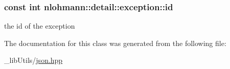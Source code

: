 \subsubsection[{\texorpdfstring{id}{id}}]{\setlength{\rightskip}{0pt plus 5cm}const int nlohmann\+::detail\+::exception\+::id}\hypertarget{classnlohmann_1_1detail_1_1exception_a0d4589a3fb54e81646d986c05efa3b9a}{}\label{classnlohmann_1_1detail_1_1exception_a0d4589a3fb54e81646d986c05efa3b9a}


the id of the exception 



The documentation for this class was generated from the following file\+:\begin{DoxyCompactItemize}
\item 
\+\_\+lib\+Utils/\hyperlink{json_8hpp}{json.\+hpp}\end{DoxyCompactItemize}
